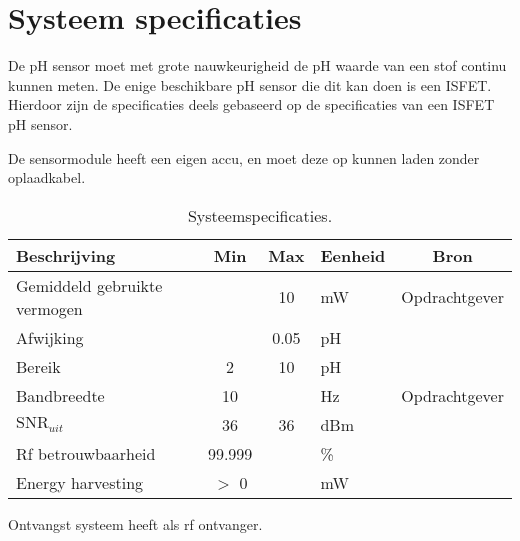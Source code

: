 \section{Systeem specificaties}\label{sec:systemSpecifications}
De pH sensor moet met grote nauwkeurigheid de pH waarde van een stof continu kunnen meten. 
De enige beschikbare pH sensor die dit kan doen is een ISFET.
Hierdoor zijn de specificaties deels gebaseerd op de specificaties van een ISFET pH sensor.

De sensormodule heeft een eigen accu, en moet deze op kunnen laden zonder oplaadkabel.

\begin{table}[ht]
    \centering
    \begin{tabular}{|l|c c|l|c|}
        \hline
        Beschrijving                 & Min & Max  & Eenheid   & Bron \\
        \hline 
        Gemiddeld gebruikte vermogen &          & 10    & mW        & Opdrachtgever \\
        Afwijking                    &          & 0.05  & pH        & \cite{isfet} \\ 
        Bereik                       & 2        & 10    & pH        & \cite{isfet} \\
        Bandbreedte                  & 10       &       & Hz        & Opdrachtgever\\
        $\mathrm{SNR}_{uit}$         & 36       & 36    & dBm       & \\
        Rf betrouwbaarheid           & 99.999   &       & \%        & \\
        Energy harvesting            & $>$ 0    &       & mW        & \\
        \hline
    \end{tabular}
    \caption{Systeemspecificaties.}
    \label{tab:systemSpecs}
\end{table}

Ontvangst systeem heeft \mcu als rf ontvanger.




